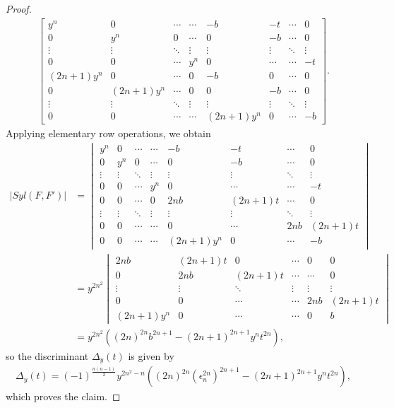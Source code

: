 \documentclass[10pt,a4paper,reqno]{amsart}
\theoremstyle{definition}
\numberwithin{equation}{section}
\numberwithin{figure}{section}
\newcommand{\ep}{\epsilon}
\begin{document}
\begin{proof}
\begin{align*}
\begin{bmatrix}
y^n & 0 & \cdots & \cdots & -b  & -t & \cdots & 0 \\
0 & y^n &0 & \cdots & 0  & -b & \cdots & 0 \\
\vdots & \vdots &\ddots & \vdots & \vdots &\vdots & \ddots &\vdots \\
0&0&\cdots&y^n&0&\cdots&\cdots&-t \\
(2n+1)y^n&0&\cdots&0&-b&0&\cdots &0 \\
0&(2n+1)y^n&\cdots&0&0&-b&\cdots &0 \\
\vdots &\vdots &\ddots&\vdots &\vdots &\vdots &\ddots &\vdots \\
0&0&\cdots&\cdots&(2n+1)y^n&0&\cdots&-b
\end{bmatrix}.
\end{align*}
Applying elementary row operations, we obtain
\begin{align*}
|Syl(F,F')|&=
\begin{vmatrix}
y^n & 0 & \cdots & \cdots & -b  & -t & \cdots & 0 \\
0 & y^n &0 & \cdots & 0  & -b & \cdots & 0 \\
\vdots & \vdots &\ddots & \vdots & \vdots &\vdots & \ddots &\vdots \\
0&0&\cdots&y^n&0&\cdots&\cdots&-t \\
0&0&\cdots&0&2nb&(2n+1)t&\cdots &0 \\
\vdots &\vdots &\ddots&\vdots &\vdots &\vdots &\ddots &\vdots \\
0&0&\cdots&\cdots&0&\cdots &2nb&(2n+1)t \\
0&0&\cdots&\cdots&(2n+1)y^n&0 &\cdots & -b
\end{vmatrix}\\
&=y^{2n^2} 
\begin{vmatrix}
2nb & (2n+1)t &0 & \cdots & 0  & 0  \\
0&2nb &(2n+1)t&\cdots&\cdots&0 \\
\vdots &\vdots &\ddots&\vdots &\vdots &\vdots \\
0&0&\cdots&\cdots &2nb&(2n+1)t \\
(2n+1)y^n&0&\cdots&\cdots &0& b
\end{vmatrix} \\
&=y^{2n^2}((2n)^{2n}b^{2n+1}-(2n+1)^{2n+1}y^n t^{2n}),
\end{align*}
so the discriminant $\Delta_y(t)$ is given by
\begin{align*}
\Delta_y(t)=(-1)^{\frac{n(n-1)}{2}} y^{2n^2-n}((2n)^{2n}({\ep_n^{2n}})^{2n+1}-(2n+1)^{2n+1}y^n t^{2n}),
\end{align*}
which proves the claim.
\end{proof}
\end{document}
